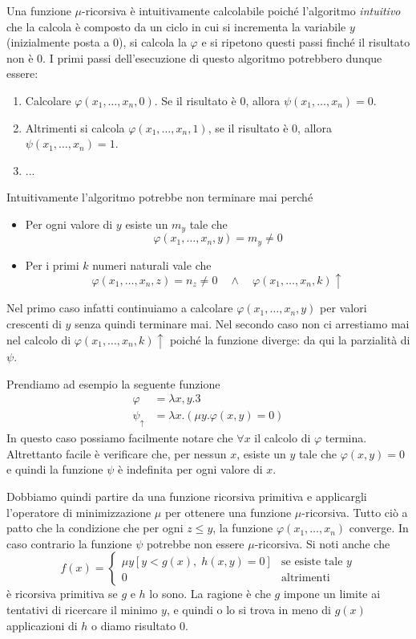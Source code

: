 Una funzione $\mu$-ricorsiva è intuitivamente calcolabile poiché
l'algoritmo \emph{intuitivo} che la calcola è composto da un
ciclo in cui si incrementa la variabile $y$ (inizialmente posta
a $0$), si calcola la $\varphi$ e si ripetono questi passi
finché il risultato non è $0$. I primi passi dell'esecuzione
di questo algoritmo potrebbero dunque essere:
\begin{enumerate}
	\item Calcolare $\varphi(x_1, \dots, x_n, 0)$. Se il
	      risultato è $0$, allora $\psi (x_1, \dots, x_n) = 0$.
	\item Altrimenti si calcola $\varphi(x_1, \dots, x_n, 1)$,
	      se il risultato è $0$, allora
	      $\psi(x_1, \dots, x_n)=1$.
	\item ...
\end{enumerate}
Intuitivamente l'algoritmo potrebbe non terminare mai perché
\begin{itemize}
	\item Per ogni valore di $y$ esiste un $m_y$ tale che
	      \[ \varphi (x_1, \dots, x_n, y) = m_y \neq 0 \]
	\item Per i primi $k$ numeri naturali vale che
	      \[
		      \varphi (x_1, \dots, x_n, z) = n_z \neq 0
		      \quad \land \quad
		      \varphi (x_1, \dots, x_n, k) \uparrow
	      \]
\end{itemize}
Nel primo caso infatti continuiamo a calcolare
$\varphi(x_1, \dots, x_n, y)$ per valori crescenti di $y$ senza
quindi terminare mai. Nel secondo caso non ci arrestiamo mai nel
calcolo di $\varphi (x_1, \dots, x_n, k) \uparrow$ poiché la
funzione diverge: da qui la parzialità di $\psi$.

\begin{example}
	Prendiamo ad esempio la seguente funzione
	\begin{align*}
		\varphi       & = \lambda x, y . 3 \\
		\psi_\uparrow & =
		\lambda x . (\mu y . \varphi(x, y) = 0)
	\end{align*}
	In questo caso possiamo facilmente notare che $\forall x$ il
	calcolo di $\varphi$ termina. Altrettanto facile è
	verificare che, per nessun $x$, esiste un $y$ tale che
	$\varphi (x, y) = 0$ e quindi la funzione $\psi$ è
	indefinita per ogni valore di $x$.
\end{example}

Dobbiamo quindi partire da una funzione ricorsiva primitiva e
applicargli l'operatore di minimizzazione $\mu$ per ottenere
una funzione $\mu$-ricorsiva. Tutto ciò a patto che la
condizione che per ogni $z \leq y$, la funzione
$\varphi (x_1, \dots, x_n)$ converge. In caso contrario la
funzione $\psi$ potrebbe non essere $\mu$-ricorsiva. Si noti
anche che
\[
	f(x) = \begin{cases}
		\mu y [y < g(x), \; h(x, y) = 0] &
		\text{se esiste tale } y                             \\
		0                                & \text{altrimenti}
	\end{cases}
\]
è ricorsiva primitiva se $g$ e $h$ lo sono. La ragione è che $g$
impone un limite ai tentativi di ricercare il minimo $y$, e
quindi o lo si trova in meno di $g(x)$ applicazioni di $h$ o
diamo risultato $0$.

